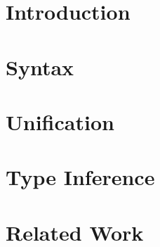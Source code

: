 \documentclass[acmsmall,nonacm]{acmart}
\begin{document}
\section{Introduction}
\label{sec:intro}


\section{Syntax}
\label{sec:syntax}


% 

\section{Unification}
\label{sec:unification}


\section{Type Inference}
\label{sec:typeinference}


\section{Related Work}
\label{sec:relatedwork}


% 




\appendix
\end{document}
